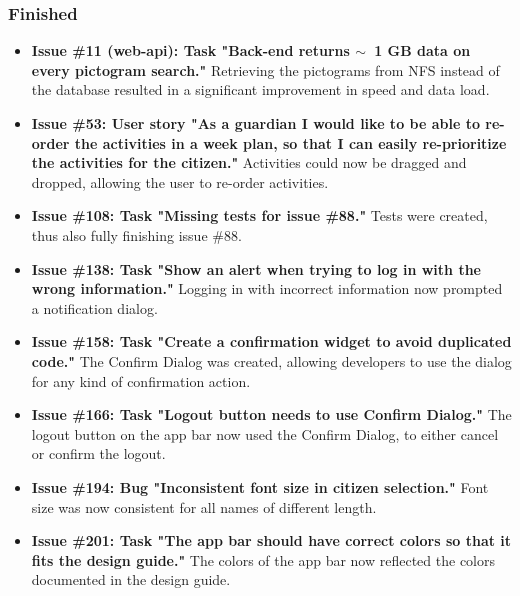 \subsubsection{Finished}
\begin{itemize}
    \item \textbf{Issue \#11 (web-api): Task "Back-end returns $\sim$~1 GB data on every pictogram search."}
        \subitem Retrieving the pictograms from NFS instead of the database resulted in a significant improvement in speed and data load.
    \item \textbf{Issue \#53: User story "As a guardian I would like to be able to re-order the activities in a week plan, so that I can easily re-prioritize the activities for the citizen."}
        \subitem Activities could now be dragged and dropped, allowing the user to re-order activities.
    \item \textbf{Issue \#108: Task "Missing tests for issue \#88."}
        \subitem Tests were created, thus also fully finishing issue \#88.
    \item \textbf{Issue \#138: Task "Show an alert when trying to log in with the wrong information."}
        \subitem Logging in with incorrect information now prompted a notification dialog.
    \item \textbf{Issue \#158: Task "Create a confirmation widget to avoid duplicated code."}
        \subitem The Confirm Dialog was created, allowing developers to use the dialog for any kind of confirmation action.
    \item \textbf{Issue \#166: Task "Logout button needs to use Confirm Dialog."}
        \subitem The logout button on the app bar now used the Confirm Dialog, to either cancel or confirm the logout.
    \item \textbf{Issue \#194: Bug "Inconsistent font size in citizen selection."}
        \subitem Font size was now consistent for all names of different length.
    \item \textbf{Issue \#201: Task "The app bar should have correct colors so that it fits the design guide."}
        \subitem The colors of the app bar now reflected the colors documented in the design guide. 
\end{itemize}

